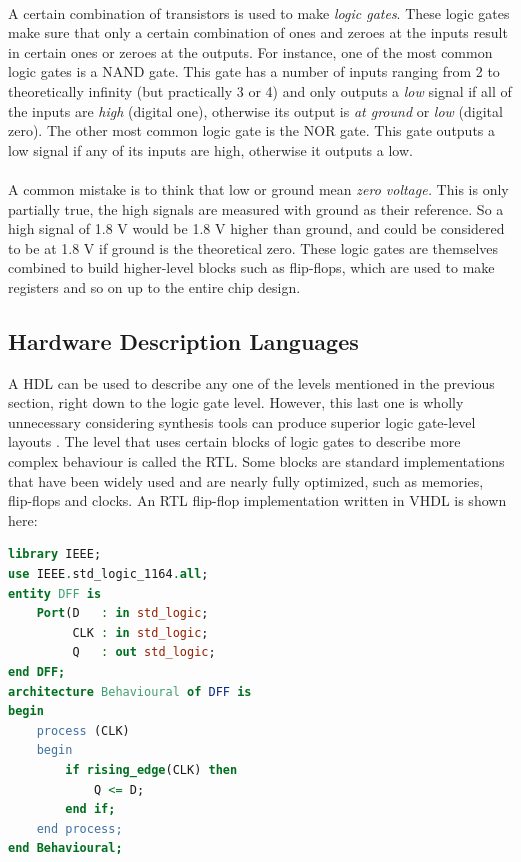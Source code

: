 \documentclass[11pt,british]{article}
\begin{document}
\\
A certain combination of transistors is used to make \emph{logic gates}. These logic gates make sure that only a certain combination of ones and zeroes at the inputs result in certain ones or zeroes at the outputs. For instance, one of the most common logic gates is a \gls{NAND} gate. This gate has a number of inputs ranging from 2 to theoretically infinity (but practically 3 or 4) and only outputs a \emph{low} signal if all of the inputs are \emph{high} (digital one), otherwise its output is \emph{at ground} or \emph{low} (digital zero). The other most common logic gate is the \gls{NOR} gate. This gate outputs a low signal if any of its inputs are high, otherwise it outputs a low.
\\
\\
A common mistake is to think that low or ground mean \emph{zero voltage.} This is only partially true, the high signals are measured with ground as their reference. So a high signal of 1.8 V would be 1.8 V higher than ground, and could be considered to be at 1.8 V if ground is the theoretical zero. These logic gates are themselves combined to build higher-level blocks such as flip-flops, which are used to make registers and so on up to the entire chip design.

\pagebreak

\subsection{Hardware Description Languages}
\label{subsec:HDL}

A \gls{HDL} can be used to describe any one of the levels mentioned in the previous section, right down to the logic gate level. However, this last one is wholly unnecessary considering synthesis tools can produce superior logic gate-level layouts \cite{VHDLintro}. The level that uses certain blocks of logic gates to describe more complex behaviour is called the \gls{RTL}. Some blocks are standard implementations that have been widely used and are nearly fully optimized, such as memories, flip-flops and clocks. An \gls{RTL} flip-flop implementation written in \gls{VHDL} is shown here: 
\begin{lstlisting}[language=VHDL, tabsize=4, frame=single, framesep=2mm, belowskip=16pt, aboveskip=16pt, showstringspaces=false]
library IEEE;
use IEEE.std_logic_1164.all;
entity DFF is
	Port(D 	 : in std_logic;
		 CLK : in std_logic;
		 Q 	 : out std_logic;
end DFF;
architecture Behavioural of DFF is
begin
	process (CLK)
	begin
		if rising_edge(CLK) then
			Q <= D;
		end if;
	end process;
end Behavioural;
\end{lstlisting}
\end{document}

